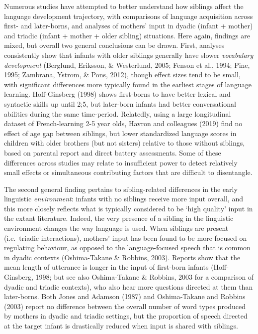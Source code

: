 \documentclass[
  english,
  man,floatsintext]{apa6}
\begin{document}
Numerous studies have attempted to better understand how siblings affect the language development trajectory, with comparisons of language acquisition across first- and later-borns, and analyses of mothers' input in dyadic (infant + mother) and triadic (infant + mother + older sibling) situations. Here again, findings are mixed, but overall two general conclusions can be drawn. First, analyses consistently show that infants with older siblings generally have slower \emph{vocabulary development} (Berglund, Eriksson, \& Westerlund, 2005; Fenson et al., 1994; Pine, 1995; Zambrana, Ystrom, \& Pons, 2012), though effect sizes tend to be small, with significant differences more typically found in the earliest stages of language learning. Hoff-Ginsberg (1998) shows first-borns to have better lexical and syntactic skills up until 2;5, but later-born infants had better conversational abilities during the same time-period. Relatedly, using a large longitudinal dataset of French-learning 2-5 year olds, Havron and colleagues (2019) find no effect of age gap between siblings, but lower standardized language scores in children with older brothers (but not sisters) relative to those without siblings, based on parental report and direct battery assessments. Some of these differences across studies may relate to insufficient power to detect relatively small effects or simultaneous contributing factors that are difficult to disentangle.

The second general finding pertains to sibling-related differences in the early linguistic \emph{environment}: infants with no siblings receive more input overall, and this more closely reflects what is typically considered to be `high quality' input in the extant literature. Indeed, the very presence of a sibling in the linguistic environment changes the way language is used. When siblings are present (i.e.~triadic interactions), mothers' input has been found to be more focused on regulating behaviour, as opposed to the language-focused speech that is common in dyadic contexts (Oshima-Takane \& Robbins, 2003). Reports show that the mean length of utterance is longer in the input of first-born infants (Hoff-Ginsberg, 1998; but see also Oshima-Takane \& Robbins, 2003 for a comparison of dyadic and triadic contexts), who also hear more questions directed at them than later-borns. Both Jones and Adamson (1987) and Oshima-Takane and Robbins (2003) report no difference between the overall number of word types produced by mothers in dyadic and triadic settings, but the proportion of speech directed at the target infant is drastically reduced when input is shared with siblings.
\end{document}
